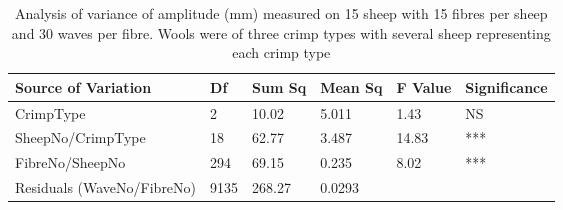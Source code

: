 %

\begin{table}[htp]
\centering
\caption{Analysis of variance of amplitude (mm) measured on 15 sheep with 15 fibres per sheep and 30 waves per fibre. Wools were of three crimp types with several sheep representing each crimp type}
\label{tab:sfamplaov}
\vspace{0.1in}
\begin{tabular}{|p{1.4in}|p{0.4in}|p{0.4in}|p{0.4in}|p{0.4in}|p{0.8in}|} \hline
     Source of Variation & Df & Sum Sq  & Mean Sq  & F Value  & Significance  \\  \hline
 CrimpType & 2 & 10.02 & 5.011 & 1.43 & NS  \\
 SheepNo/CrimpType & 18 & 62.77 & 3.487 &  14.83 & ***    \\ 
 FibreNo/SheepNo & 294 & 69.15 & 0.235 & 8.02 & ***  \\
 Residuals (WaveNo/FibreNo) & 9135 & 268.27 & 0.0293 & & \\ \hline
\end{tabular}
\end{table}

%
